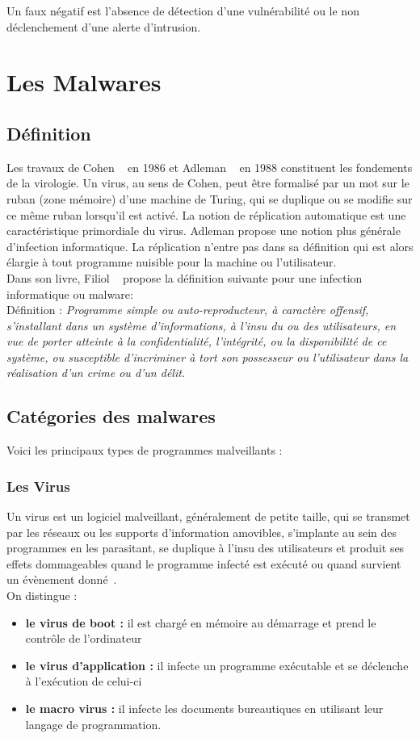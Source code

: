 Un faux négatif est l'absence de détection d'une vulnérabilité ou le non déclenchement d'une alerte d'intrusion.

\section{Les Malwares}

\subsection{Définition}
Les travaux de Cohen ~\cite{coh} en 1986 et Adleman ~\cite{adl} en 1988 constituent les fondements de la virologie. Un virus, au sens de Cohen, peut être formalisé par un mot sur le ruban (zone mémoire) d'une machine de Turing, qui se duplique ou se modifie sur ce même ruban lorsqu'il est activé. La notion de réplication automatique est une caractéristique primordiale du virus. Adleman propose une notion plus générale d'infection informatique. La réplication n'entre pas dans sa définition qui est alors élargie à tout programme nuisible pour la machine ou l'utilisateur. \\


Dans son livre, Filiol ~\cite{anti} propose la définition suivante pour une infection informatique ou malware:\\


Définition : \textit{
Programme simple ou auto-reproducteur, à caractère offensif, s'installant dans 
un système d'informations, à l'insu du ou des utilisateurs, en vue de porter atteinte
à la confidentialité, l'intégrité, ou la disponibilité de ce système, ou susceptible 
d'incriminer à tort son possesseur ou l'utilisateur dans la réalisation d'un crime 
ou d'un délit.}\\

\subsection{Catégories des malwares}
Voici les principaux types de programmes malveillants :

\subsubsection{Les Virus}
Un virus est un logiciel malveillant, généralement de petite taille, qui se transmet par les réseaux ou les supports d'information amovibles, s'implante au sein des programmes en les parasitant, se duplique à l'insu des utilisateurs et produit ses effets dommageables quand le programme infecté est exécuté ou quand survient un évènement donné~\cite{virus}.\\
On distingue :
\begin{itemize}


\item \textbf{ le virus de boot :} il est chargé en mémoire au démarrage et prend le contrôle de l'ordinateur
\item \textbf{ le virus d'application :} il infecte un programme exécutable et se déclenche à l'exécution de celui-ci
\item \textbf{ le macro virus :} il infecte les documents bureautiques en utilisant leur langage de programmation.
\end{itemize}
